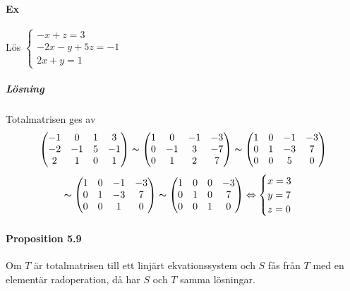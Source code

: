 \paragraph{Ex} Lös $\begin{cases}-x+z=3\\-2x-y+5z=-1\\2x+y=1\end{cases}$
\subparagraph{Lösning} Totalmatrisen ges av 
\begin{equation*}
    \begin{pmatrix}
        -1&0&1&3\\
        -2&-1&5&-1\\
        2&1&0&1
    \end{pmatrix} 
    \thicksim
    \begin{pmatrix}
        1&0&-1&-3\\
        0&-1&3&-7\\
        0&1&2&7
    \end{pmatrix}
    \thicksim
    \begin{pmatrix}
        1&0&-1&-3\\
        0&1&-3&7\\
        0&0&5&0
    \end{pmatrix}
\end{equation*}
\begin{equation*}
    \thicksim
    \begin{pmatrix}
        1&0&-1&-3\\
        0&1&-3&7\\
        0&0&1&0
    \end{pmatrix}
    \thicksim
    \begin{pmatrix}
        1&0&0&-3\\
        0&1&0&7\\
        0&0&1&0
    \end{pmatrix}
    \Leftrightarrow
    \begin{cases}
        x=3\\
        y=7\\
        z=0
    \end{cases}
\end{equation*}

\paragraph{Proposition 5.9} Om $T$ är totalmatrisen till ett linjärt ekvationssystem och 
$S$ fås från $T$ med en elementär radoperation, då har $S$ och $T$ samma lösningar.

